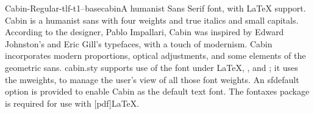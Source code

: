 \documentclass{ddltxtyp}
\begin{document}
\begin{package}{Cabin-Regular-tlf-t1--base}{cabin}{A humanist Sans Serif font, with {\LaTeX} support.}
Cabin is a humanist sans with four weights and true italics and
small capitals. According to the designer, Pablo Impallari,
Cabin was inspired by Edward Johnston's and Eric Gill's
typefaces, with a touch of modernism. Cabin incorporates modern
proportions, optical adjustments, and some elements of the
geometric sans. cabin.sty supports use of the font under {\LaTeX},
{\pdfLaTeX}, {\XeLaTeX} and {\LuaLaTeX}; it uses the mweights, to manage
the user's view of all those font weights. An sfdefault option
is provided to enable Cabin as the default text font. The
fontaxes package is required for use with [pdf]{\LaTeX}.
\end{package}
\end{document}
